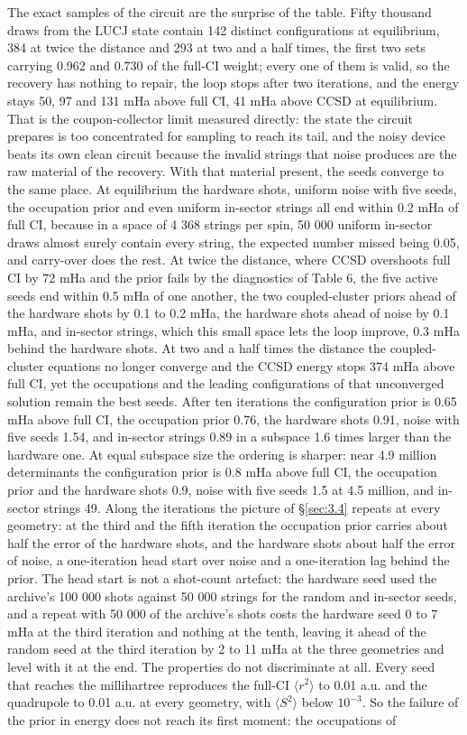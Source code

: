 \documentclass[11pt]{article}
\begin{document}
The exact samples of the circuit are the surprise of the table. Fifty thousand draws from the LUCJ state contain 142 distinct configurations at equilibrium, 384 at twice the distance and 293 at two and a half times, the first two sets carrying 0.962 and 0.730 of the full-CI weight; every one of them is valid, so the recovery has nothing to repair, the loop stops after two iterations, and the energy stays 50, 97 and 131 mHa above full CI, 41 mHa above CCSD at equilibrium. That is the coupon-collector limit measured directly: the state the circuit prepares is too concentrated for sampling to reach its tail, and the noisy device beats its own clean circuit because the invalid strings that noise produces are the raw material of the recovery. With that material present, the seeds converge to the same place. At equilibrium the hardware shots, uniform noise with five seeds, the occupation prior and even uniform in-sector strings all end within 0.2 mHa of full CI, because in a space of 4 368 strings per spin, 50 000 uniform in-sector draws almost surely contain every string, the expected number missed being 0.05, and carry-over does the rest. At twice the distance, where CCSD overshoots full CI by 72 mHa and the prior fails by the diagnostics of Table 6, the five active seeds end within 0.5 mHa of one another, the two coupled-cluster priors ahead of the hardware shots by 0.1 to 0.2 mHa, the hardware shots ahead of noise by 0.1 mHa, and in-sector strings, which this small space lets the loop improve, 0.3 mHa behind the hardware shots. At two and a half times the distance the coupled-cluster equations no longer converge and the CCSD energy stops 374 mHa above full CI, yet the occupations and the leading configurations of that unconverged solution remain the best seeds. After ten iterations the configuration prior is 0.65 mHa above full CI, the occupation prior 0.76, the hardware shots 0.91, noise with five seeds 1.54, and in-sector strings 0.89 in a subspace 1.6 times larger than the hardware one. At equal subspace size the ordering is sharper: near 4.9 million determinants the configuration prior is 0.8 mHa above full CI, the occupation prior and the hardware shots 0.9, noise with five seeds 1.5 at 4.5 million, and in-sector strings 49. Along the iterations the picture of \S\ref{sec:3.4} repeats at every geometry: at the third and the fifth iteration the occupation prior carries about half the error of the hardware shots, and the hardware shots about half the error of noise, a one-iteration head start over noise and a one-iteration lag behind the prior. The head start is not a shot-count artefact: the hardware seed used the archive's 100 000 shots against 50 000 strings for the random and in-sector seeds, and a repeat with 50 000 of the archive's shots costs the hardware seed 0 to 7 mHa at the third iteration and nothing at the tenth, leaving it ahead of the random seed at the third iteration by 2 to 11 mHa at the three geometries and level with it at the end. The properties do not discriminate at all. Every seed that reaches the millihartree reproduces the full-CI $\langle r^{2}\rangle$ to 0.01 a.u. and the quadrupole to 0.01 a.u. at every geometry, with $\langle S^{2}\rangle$ below $10^{-3}$. So the failure of the prior in energy does not reach its first moment: the occupations of 
\end{document}
